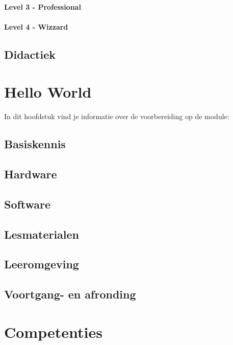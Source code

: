 \documentclass[]{book}
\begin{document}
\subsubsection{Level 3 - Professional}\label{level-3---professional}

\subsubsection{Level 4 - Wizzard}\label{level-4---wizzard}

\section{Didactiek}\label{didactiek}

\chapter{Hello World}\label{hello-world}

In dit hoofdstuk vind je informatie over de voorbereiding op de module:

\section{Basiskennis}\label{basiskennis}

\section{Hardware}\label{hardware}

\section{Software}\label{software}

\section{Lesmaterialen}\label{lesmaterialen}

\section{Leeromgeving}\label{leeromgeving}

\section{Voortgang- en afronding}\label{voortgang--en-afronding}

\chapter{Competenties}\label{competenties}
\end{document}
